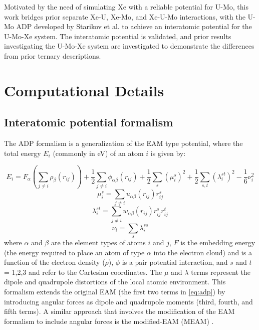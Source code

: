 \documentclass[review]{elsarticle}
\begin{document}
Motivated by the need of simulating Xe with a reliable potential for U-Mo, this work bridges prior separate Xe-U, Xe-Mo, and Xe-U-Mo interactions, with the U-Mo ADP developed by Starikov et al. \cite{starikov2018} to achieve an interatomic potential for the U-Mo-Xe system. The interatomic potential is validated, and prior results investigating the U-Mo-Xe system are investigated to demonstrate the differences from prior ternary descriptions.

\section{Computational Details}

\subsection{Interatomic potential formalism}

The ADP \cite{mishin2005} formalism is a generalization of the EAM type potential, where the total energy $E_i$ (commonly in eV) of an atom $i$ is given by:

\begin{equation}\label{eq:adp}
E_i = F_{\alpha} \left( \sum\limits_{j\neq i} \rho_{\beta}(r_{ij}) \right) + \frac{1}{2}\sum\limits_{j \neq i} \phi_{\alpha \beta}(r_{ij}) + \frac{1}{2}\sum\limits_{s}(\mu_i^s)^2 + \frac{1}{2}\sum\limits_{s,t}(\lambda_i^{st})^2 - \frac{1}{6}\nu_i^2 
\end{equation}
\begin{equation}
\mu_i^s = \sum\limits_{j \neq i} u_{\alpha \beta}(r_{ij})r_{ij}^s
\end{equation}
\begin{equation}
\lambda_i^{st} = \sum\limits_{j \neq i} w_{\alpha \beta}(r_{ij})r_{ij}^s r_{ij}^t
\end{equation}
\begin{equation}
\nu_i = \sum\limits_{s} \lambda_i^{ss} 
\end{equation}
\noindent where $\alpha$ and $\beta$ are the element types of atoms $i$ and $j$, $F$ is the embedding energy (the energy required to place an atom of type $\alpha$ into the electron cloud) and is a function of the electron density ($\rho$), $\phi$ is a pair potential interaction, and $s$ and $t$ = 1,2,3 and refer to the Cartesian coordinates. The $\mu$ and $\lambda$ terms represent the dipole and quadrupole distortions of the local atomic environment. This formalism extends the original EAM (the first two terms in \cref{eq:adp}) by introducing angular forces as dipole and quadrupole moments (third, fourth, and fifth terms). A similar approach that involves the modification of the EAM formalism to include angular forces is the modified-EAM (MEAM) \cite{baskes1989,baskes1992}. 
\end{document}
